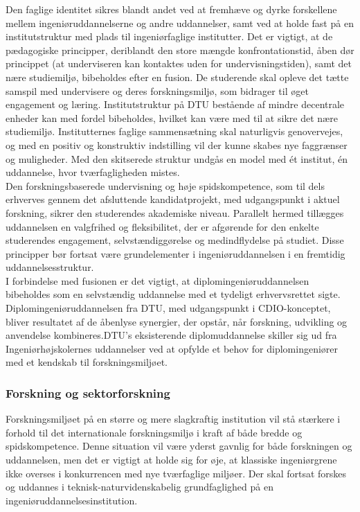 Den faglige identitet sikres blandt andet ved at fremhæve og dyrke forskellene mellem ingeniøruddannelserne og andre uddannelser, samt ved at holde fast på en institutstruktur med plads til ingeniørfaglige institutter. Det er vigtigt, at de pædagogiske principper, deriblandt den store mængde konfrontationstid, åben dør princippet (at underviseren kan kontaktes uden for undervisningstiden), samt det nære studiemiljø, bibeholdes efter en fusion. De studerende skal opleve det tætte samspil med undervisere og deres forskningsmiljø, som bidrager til øget engagement og læring. Institutstruktur på DTU bestående af mindre decentrale enheder kan med fordel bibeholdes, hvilket kan være med til at sikre det nære studiemiljø. Institutternes faglige sammensætning skal naturligvis genovervejes, og med en positiv og konstruktiv indstilling vil der kunne skabes nye faggrænser og muligheder. Med den skitserede struktur undgås en model med ét institut, én uddannelse, hvor tværfagligheden mistes.\\

Den forskningsbaserede undervisning og høje spidskompetence, som til dels erhverves gennem det afsluttende kandidatprojekt, med udgangspunkt i aktuel forskning, sikrer den studerendes akademiske niveau. Parallelt hermed tillægges uddannelsen en valgfrihed og fleksibilitet, der er afgørende for den enkelte studerendes engagement, selvstændiggørelse og medindflydelse på studiet. Disse principper bør fortsat være grundelementer i ingeniøruddannelsen i en fremtidig uddannelsesstruktur.\\

I forbindelse med fusionen er det vigtigt, at diplomingeniøruddannelsen bibeholdes som en selvstændig uddannelse med et tydeligt erhvervsrettet sigte. Diplomingeniøruddannelsen fra DTU, med udgangspunkt i CDIO-konceptet, bliver resultatet af de åbenlyse synergier, der opstår, når forskning, udvikling og anvendelse kombineres.DTU’s eksisterende diplomuddannelse skiller sig ud fra Ingeniørhøjskolernes uddannelser ved at opfylde et behov for diplomingeniører med et kendskab til forskningsmiljøet.

\subsubsection{Forskning og sektorforskning}
Forskningsmiljøet på en større og mere slagkraftig institution vil stå stærkere i forhold til det internationale forskningsmiljø i kraft af både bredde og spidskompetence. Denne situation vil være yderst gavnlig for både forskningen og uddannelsen, men det er vigtigt at holde sig for øje, at klassiske ingeniørgrene ikke overses i konkurrencen med nye tværfaglige miljøer. Der skal fortsat forskes og uddannes i teknisk-naturvidenskabelig grundfaglighed på en ingeniøruddannelsesinstitution.\\

